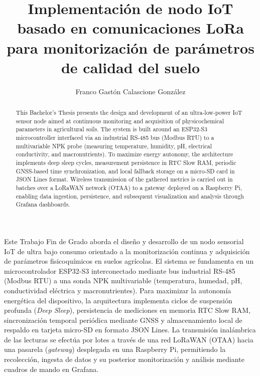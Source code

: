 \documentclass[twoside,spanish,a4paper,12pt]{tfg}
\title{Implementación de nodo IoT basado en comunicaciones LoRa para monitorización de parámetros de calidad del suelo}
\author{Franco Gastón Calascione González}
\begin{document}
\portada
\cleardoublepage
\contraportada
\cleardoublepage
\declaracion
\cleardoublepage


\begin{resumen}
Este Trabajo Fin de Grado aborda el diseño y desarrollo de un nodo sensorial IoT de ultra bajo consumo orientado a la monitorización continua y adquisición de parámetros fisicoquímicos en suelos agrícolas. El sistema se fundamenta en un microcontrolador ESP32-S3 interconectado mediante bus industrial RS-485 (Modbus RTU) a una sonda NPK multivariable (temperatura, humedad, pH, conductividad eléctrica y macronutrientes). Para maximizar la autonomía energética del dispositivo, la arquitectura implementa ciclos de suspensión profunda (\textit{Deep Sleep}), persistencia de mediciones en memoria RTC Slow RAM, sincronización temporal periódica mediante GNSS y almacenamiento local de respaldo en tarjeta micro-SD en formato JSON Lines. La transmisión inalámbrica de las lecturas se efectúa por lotes a través de una red LoRaWAN (OTAA) hacia una pasarela (\textit{gateway}) desplegada en una Raspberry Pi, permitiendo la recolección, ingesta de datos y su posterior monitorización y análisis mediante cuadros de mando en Grafana.
\end{resumen}
\cleardoublepage

\begin{abstract}
This Bachelor's Thesis presents the design and development of an ultra-low-power IoT sensor node aimed at continuous monitoring and acquisition of physicochemical parameters in agricultural soils. The system is built around an ESP32-S3 microcontroller interfaced via an industrial RS-485 bus (Modbus RTU) to a multivariable NPK probe (measuring temperature, humidity, pH, electrical conductivity, and macronutrients). To maximize energy autonomy, the architecture implements deep sleep cycles, measurement persistence in RTC Slow RAM, periodic GNSS-based time synchronization, and local fallback storage on a micro-SD card in JSON Lines format. Wireless transmission of the gathered metrics is carried out in batches over a LoRaWAN network (OTAA) to a gateway deployed on a Raspberry Pi, enabling data ingestion, persistence, and subsequent visualization and analysis through Grafana dashboards.
\end{abstract}
\cleardoublepage
\end{document}
